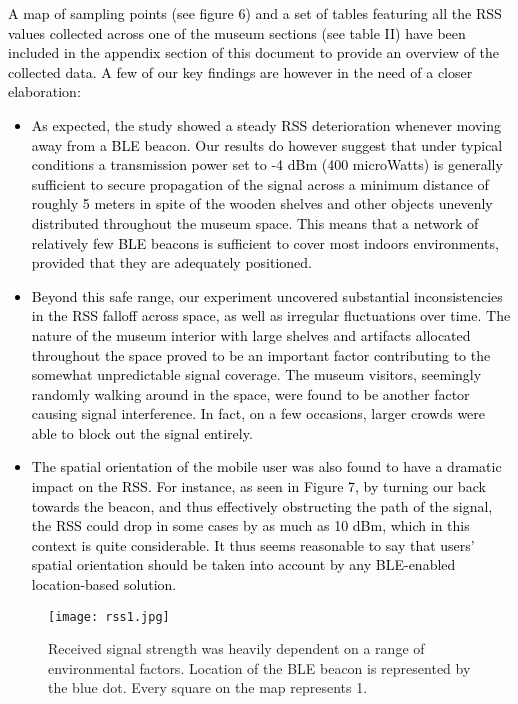 \documentclass[prodmode,acmtomm]{acmsmall}
\begin{document}
\textcolor{black}{A map of sampling points (see figure 6) and a set of tables featuring all the RSS values collected across one of the museum sections (see table II) have been included in the appendix section of this document to provide an overview of the collected data. A few of our key findings are however in the need of a closer elaboration:}
\textcolor{black}{
\begin{itemize}
  \item As expected, the study showed a steady RSS deterioration whenever moving away from a BLE beacon. Our results do however suggest that under typical conditions a transmission power set to -4 dBm (400 microWatts) is generally sufficient to secure propagation of the signal across a minimum distance of roughly 5 meters in spite of the wooden shelves and other objects unevenly distributed throughout the museum space. This means that a network of relatively few BLE beacons is sufficient to cover most indoors environments, provided that they are adequately positioned. 
\item Beyond this safe range, our experiment uncovered substantial inconsistencies in the RSS falloff across space, as well as irregular fluctuations over time. The nature of the museum interior with large shelves and artifacts allocated throughout the space proved to be an important factor contributing to the somewhat unpredictable signal coverage. The museum visitors, seemingly randomly walking around in the space, were found to be another factor causing signal interference. In fact, on a  few occasions, larger crowds were able to block out the signal entirely. 
  \item The spatial orientation of the mobile user was also found to have a dramatic impact on the RSS. For instance, as seen in Figure 7, by turning our back towards the beacon, and thus effectively obstructing the path of the signal, the RSS could drop in some cases by as much as 10 dBm, which in this context is quite considerable. It thus seems reasonable to say that users' spatial orientation should be taken into account by any BLE-enabled location-based solution. 
\end{itemize}
} 

\begin{figure}[h!]
\begin{center}
\texttt{[image: rss1.jpg]}
\caption{Received signal strength was heavily dependent on a range of environmental factors. Location of the BLE beacon is represented by the blue dot. Every square on the map represents 1.}
\end{center}
\vspace{-10pt}
\end{figure}
\end{document}
